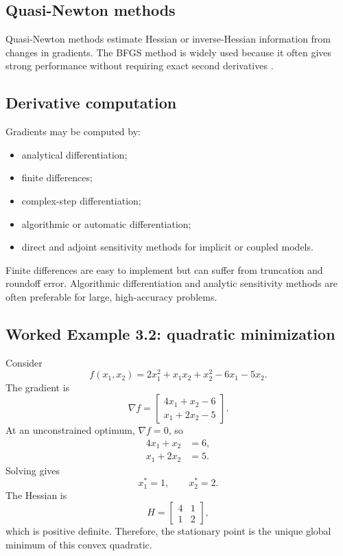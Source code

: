 \documentclass[11pt]{article}
\begin{document}
\subsection{Quasi-Newton methods}

Quasi-Newton methods estimate Hessian or inverse-Hessian information from changes in gradients. The BFGS method is widely used because it often gives strong performance without requiring exact second derivatives \cite{nocedal}.

\subsection{Derivative computation}

Gradients may be computed by:
\begin{itemize}[leftmargin=1.4em]
  \item analytical differentiation;
  \item finite differences;
  \item complex-step differentiation;
  \item algorithmic or automatic differentiation;
  \item direct and adjoint sensitivity methods for implicit or coupled models.
\end{itemize}

Finite differences are easy to implement but can suffer from truncation and roundoff error. Algorithmic differentiation and analytic sensitivity methods are often preferable for large, high-accuracy problems.

\subsection{Worked Example 3.2: quadratic minimization}

Consider
\begin{equation}
f(x_1,x_2)=2x_1^2+x_1x_2+x_2^2-6x_1-5x_2.
\end{equation}
The gradient is
\begin{equation}
\nabla f=
\begin{bmatrix}
4x_1+x_2-6 \\
x_1+2x_2-5
\end{bmatrix}.
\end{equation}
At an unconstrained optimum, $\nabla f=0$, so
\begin{align}
4x_1+x_2 &= 6, \\
x_1+2x_2 &= 5.
\end{align}
Solving gives
\begin{equation}
x_1^*=1, \qquad x_2^*=2.
\end{equation}
The Hessian is
\begin{equation}
H=\begin{bmatrix}4&1\\1&2\end{bmatrix},
\end{equation}
which is positive definite. Therefore, the stationary point is the unique global minimum of this convex quadratic.
\end{document}
